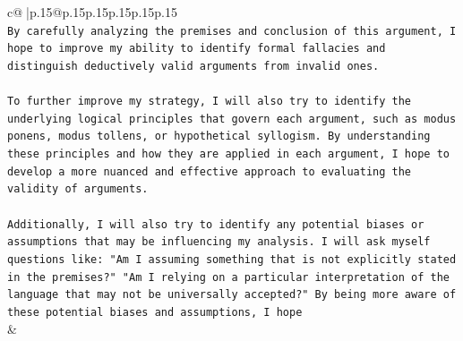 \documentclass{article}
\begin{document}
{\begin{supertabular}{c@{$\;$}|p{.15\linewidth}@{}p{.15\linewidth}p{.15\linewidth}p{.15\linewidth}p{.15\linewidth}p{.15\linewidth}}
{{{\\ 
\texttt{By carefully analyzing the premises and conclusion of this argument, I hope to improve my ability to identify formal fallacies and distinguish deductively valid arguments from invalid ones.} \\
\\ 
\texttt{To further improve my strategy, I will also try to identify the underlying logical principles that govern each argument, such as modus ponens, modus tollens, or hypothetical syllogism. By understanding these principles and how they are applied in each argument, I hope to develop a more nuanced and effective approach to evaluating the validity of arguments.} \\
\\ 
\texttt{Additionally, I will also try to identify any potential biases or assumptions that may be influencing my analysis. I will ask myself questions like: "Am I assuming something that is not explicitly stated in the premises?" "Am I relying on a particular interpretation of the language that may not be universally accepted?" By being more aware of these potential biases and assumptions, I hope} \\
            }
        }
    }
    & \\ \\

\end{supertabular}
}
\end{document}

